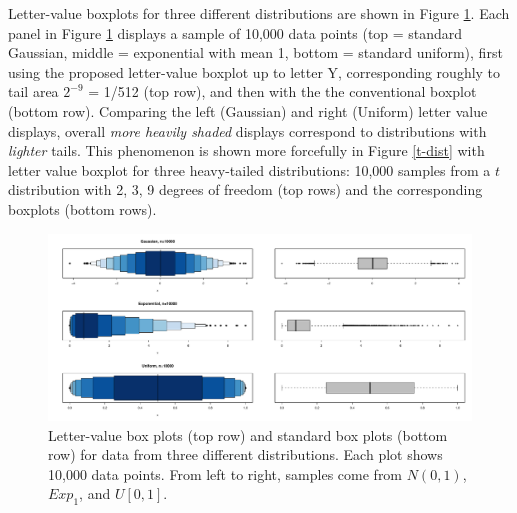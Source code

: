 \documentclass[oneside]{article}
\begin{document}
Letter-value boxplots for three different distributions are 
shown in Figure \ref{stackbox}. 
Each panel in Figure \ref{stackbox} displays a sample of 10,000 
data points (top = standard Gaussian, middle = exponential 
with mean 1, bottom = standard uniform),
first using the proposed letter-value boxplot
up to letter Y, corresponding roughly to tail area $2^{-9}$
= 1/512 (top row), and then with the
the conventional boxplot (bottom row).
Comparing the left (Gaussian) and right (Uniform) letter
value displays, overall \textit{more heavily shaded} displays 
correspond to distributions with \textit{lighter} tails.  
This phenomenon is shown more forcefully in 
Figure \ref{t-dist} with letter value boxplot for three heavy-tailed
distributions: 10,000 samples from a $t$ distribution with 2, 3, 9
degrees of freedom (top rows) and the corresponding boxplots
(bottom rows).

\begin{figure}[hbtp]
  \centering
  \includegraphics[scale=.5,angle=270]{boxplots}

  \caption{Letter-value box plots (top row) and standard box plots (bottom
  row) for data from three different distributions. Each plot shows 10,000
  data points. From left to right, samples come from $N(0,1)$, $Exp_1$, and
  $U[0,1]$. }
  \label{stackbox}
\end{figure}
\end{document}
